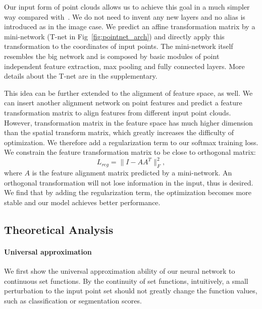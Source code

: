 Our input form of point clouds allows us to achieve this goal in a much simpler way compared with~\cite{jaderberg2015spatial}. We do not need to invent any new layers and no alias is introduced as in the image case. We predict an affine transformation matrix by a mini-network (T-net in Fig~\ref{fig:pointnet_arch}) and directly apply this transformation to the coordinates of input points. The mini-network itself resembles the big network and is composed by basic modules of point independent feature extraction, max pooling and fully connected layers. More details about the T-net are in the supplementary.

This idea can be further extended to the alignment of feature space, as well. We can insert another alignment network on point features and predict a feature transformation matrix to align features from different input point clouds. However, transformation matrix in the feature space has much higher dimension than the spatial transform matrix, which greatly increases the difficulty of optimization. We therefore add a regularization term to our softmax training loss. We constrain the feature transformation matrix to be close to orthogonal matrix:
\begin{equation}
    L_{reg} = \|I - AA^T\|_F^2,
\end{equation}
where $A$ is the feature alignment matrix predicted by a mini-network. An orthogonal transformation will not lose information in the input, thus is desired. We find that by adding the regularization term, the optimization becomes more stable and our model achieves better performance.


\subsection{Theoretical Analysis}
\label{sec:theory}
 
\paragraph{Universal approximation} We first show the universal approximation ability of our neural network to continuous set functions. By the continuity of set functions, intuitively, a small perturbation to the input point set should not greatly change the function values, such as classification or segmentation scores.

